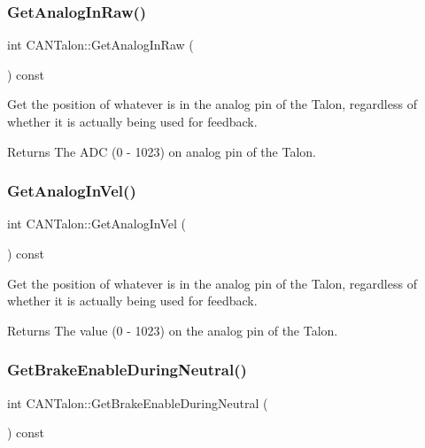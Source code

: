 \subsubsection{\texorpdfstring{Get\+Analog\+In\+Raw()}{GetAnalogInRaw()}}
{\footnotesize\ttfamily int C\+A\+N\+Talon\+::\+Get\+Analog\+In\+Raw (\begin{DoxyParamCaption}{ }\end{DoxyParamCaption}) const\hspace{0.3cm}{\ttfamily [virtual]}}

Get the position of whatever is in the analog pin of the Talon, regardless of whether it is actually being used for feedback.

\begin{DoxyReturn}{Returns}
The A\+DC (0 -\/ 1023) on analog pin of the Talon. 
\end{DoxyReturn}
\mbox{\label{class_c_a_n_talon_a2191c4ae935c1bdb33fb622402d0676f}} 
\subsubsection{\texorpdfstring{Get\+Analog\+In\+Vel()}{GetAnalogInVel()}}
{\footnotesize\ttfamily int C\+A\+N\+Talon\+::\+Get\+Analog\+In\+Vel (\begin{DoxyParamCaption}{ }\end{DoxyParamCaption}) const\hspace{0.3cm}{\ttfamily [virtual]}}

Get the position of whatever is in the analog pin of the Talon, regardless of whether it is actually being used for feedback.

\begin{DoxyReturn}{Returns}
The value (0 -\/ 1023) on the analog pin of the Talon. 
\end{DoxyReturn}
\mbox{\label{class_c_a_n_talon_ab29ed3beec31e98ce66ce66a5552fed3}} 
\subsubsection{\texorpdfstring{Get\+Brake\+Enable\+During\+Neutral()}{GetBrakeEnableDuringNeutral()}}
{\footnotesize\ttfamily int C\+A\+N\+Talon\+::\+Get\+Brake\+Enable\+During\+Neutral (\begin{DoxyParamCaption}{ }\end{DoxyParamCaption}) const}

